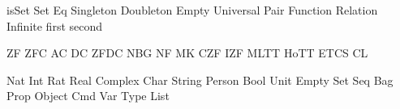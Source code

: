 \let\knuthsetminus=\setminus
\def\setminus{\mathbin{\knuthsetminus}}
\def\cantorcard#1{\overline{\overline{#1}}}
\def\cantorset{{\frak C}}
\def\continuum{\euf{c}}
\def\finord#1{\overline{#1}}
\def\eqc{\mathrel{=_{\namedop{c}}}}
\def\neqc{\mathrel{\not\eqc}}
\def\leqc{\mathrel{\leq_{\namedop{c}}}}
\def\geqc{\mathrel{\geq_{\namedop{c}}}}
\def\gtc{\mathrel{>_{\namedop{c}}}}
\def\ltc{\mathrel{<_{\namedop{c}}}}
\def\Univ{{\bbb V}}
\def\complement#1{\widetilde{#1}}
\let\compl=\complement
\def\russell#1{{\mathbf{r}(#1)}}
\def\metain{\mathrel{\in\kern-0.425em\in}}
\let\inclass=\metain
\def\classst#1#2{\pmbb{\{}\;{#1}\;\st \;{#2}\;\pmbb{\}}}
\def\classstt#1#2{\pmbb{\{}\;{#1}\;\st \;{\text{#2}}\;\pmbb{\}}}
\def\classimg#1#2{{#1}{\pmbb[}\,{#2}\,{\pmbb]}}
\let\clsimg=\classimg
\def\universet{{\cal U}}
\DefREL isSet Set
\DefRel Eq
\DefRel Singleton
\DefRel Doubleton
\DefRel Empty
\DefRel Universal
\DefRel Pair
\DefRel Function
\DefRel Relation
\DefRel Infinite
\DefFun first
\DefFun second
\def\kurpair#1#2{\set{\set{#1}, \set{{#1}, {#2}}}}
\def\disjunion{\mathbin{\uplus}}
\def\Disjunion{\mathop{\biguplus}}
\let\dunion=\disjunion
\let\Dunion=\Disjunion
\def\setsucc#1{{#1}{}^+}
\def\kleenestar#1{{#1}^\star}
\def\kleenestarp#1{\paren{#1}^\star}
\let\kstar=\kleenestar
\let\kstarp=\kleenestarp

\DefFou ZF
\DefFou ZFC
\DefFou AC
\DefFou DC
\DefFou ZFDC
\DefFou NBG
\DefFou NF
\DefFou MK
\DefFou CZF
\DefFou IZF
\DefFou MLTT
\DefFou HoTT
\DefFou ETCS
\DefFou CL
\def\ACN{\mathord{\AC}_\nats}

\DefType Nat
\DefType Int
\DefType Rat
\DefType Real
\DefType Complex
\DefType Char
\DefType String
\DefType Person
\DefType Bool
\DefType Unit
\DefType Empty
\DefType Set
\DefType Seq
\DefType Bag
\DefType Prop
\DefType Object
\DefType Cmd
\DefType Var
\DefType Type
\DefType List
\def\lnil{\mathord{[\,]}}%
\def\lcons{\mathbin{\doublecolon}}%
\def\oftype{\mathrel{:}}
\let\is=\oftype
\let\hastype=\is
\def\namedrule#1{{\scshape #1}}
\def\rulelabel#1{{\smaller\scshape #1}}
\let\cons=\namedcons
\let\type=\namedtype
\let\fun=\namedfun
\let\var=\namedvar

